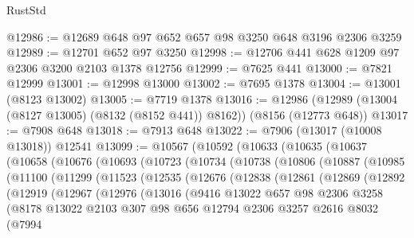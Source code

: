 \begin{lexlean}{RustStd}
\begin{coremodule}
@12986 := @12689 @648 @97 @652 @657 @98 @3250 @648 @3196 @2306 @3259
@12989 := @12701 @652 @97 @3250
@12998 := @12706 @441 @628 @1209 @97 @2306 @3200 @2103 @1378 @12756
@12999 := @7625 @441
@13000 := @7821 @12999
@13001 := @12998 @13000
@13002 := @7695 @1378
@13004 := @13001 (@8123 @13002)
@13005 := @7719 @1378
@13016 := @12986 (@12989 (@13004 (@8127 @13005) (@8132 (@8152 @441)) @8162)) (@8156 (@12773 @648))
@13017 := @7908 @648
@13018 := @7913 @648
@13022 := @7906 (@13017 (@10008 @13018)) @12541
@13099 := @10567
    (@10592
      (@10633
        (@10635
          (@10637
            (@10658
              (@10676
                (@10693
                  (@10723
                    (@10734
                      (@10738
                        (@10806
                          (@10887
                            (@10985
                              (@11100
                                (@11299
                                  (@11523
                                    (@12535
                                      (@12676
                                        (@12838
                                          (@12861
                                            (@12869
                                              (@12892
                                                (@12919
                                                  (@12967
                                                    (@12976
                                                      (@13016
                                                        (@9416
                                                          @13022
                                                          @657
                                                          @98
                                                          @2306
                                                          @3258
                                                          (@8178
                                                            @13022
                                                            @2103
                                                            @307
                                                            @98
                                                            @656
                                                            @12794
                                                            @2306
                                                            @3257
                                                            @2616
                                                            @8032
                                                            (@7994

\end{coremodule}
\end{lexlean}
